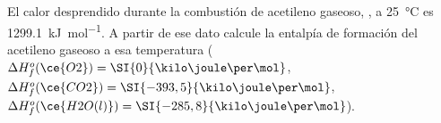 El calor desprendido durante la combustión de acetileno gaseoso, , a \SI{25}{\celsius} es \SI{1299,1}{\kilo\joule\per\mol}. A partir de ese dato calcule la entalpía de formación del acetileno gaseoso a esa temperatura ($\Delta H^o_f(\ce{O2}) = \SI{0}{\kilo\joule\per\mol}$, $\Delta H^o_f(\ce{CO2}) = \SI{-393,5}{\kilo\joule\per\mol}$, $\Delta H^o_f(\ce{H2O(l)}) = \SI{-285,8}{\kilo\joule\per\mol}$).
